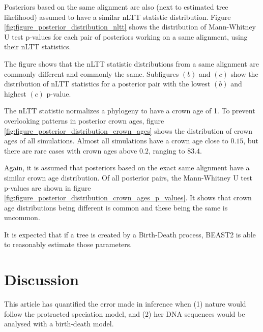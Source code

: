 \documentclass{article}
\begin{document}
Posteriors based on the same alignment are also (next to estimated tree likelihood) 
assumed to have a similar nLTT statistic distribution. 
Figure \ref{fig:figure_posterior_distribution_nltt} 
shows the distribution of Mann-Whitney U test p-values for each pair of 
posteriors working on a same alignment, 
using their nLTT statistics.

The figure shows that the nLTT statistic distributions 
from a same alignment are commonly different and commonly the same. 
Subfigures $(b)$ and $(c)$ show the distribution of
nLTT statistics for a posterior pair with the lowest $(b)$ and 
highest $(c)$ p-value.

The nLTT statistic normalizes a phylogeny to have a crown age of 1.
To prevent overlooking patterns in posterior crown ages, 
figure \ref{fig:figure_posterior_distribution_crown_ages}
shows the distribution of crown ages of all simulations.
Almost all simulations have a crown age close to $0.15$, but there
are rare cases with crown ages above $0.2$, ranging to $83.4$.


Again, it is assumed that posteriors based on the exact same alignment
have a similar crown age distribution. Of all posterior pairs, the Mann-Whitney
U test p-values are shown in figure \ref{fig:figure_posterior_distribution_crown_ages_p_values}.
It shows that crown age distributions being different is common and these
being the same is uncommon. 


It is expected that if a tree is created by a Birth-Death process, BEAST2 is able
to reasonably estimate those parameters.

\section{Discussion}

This article has quantified the error made in inference when (1) nature would follow the
protracted speciation model, and (2) her DNA sequences would be analysed with a birth-death
model.

\end{document}
